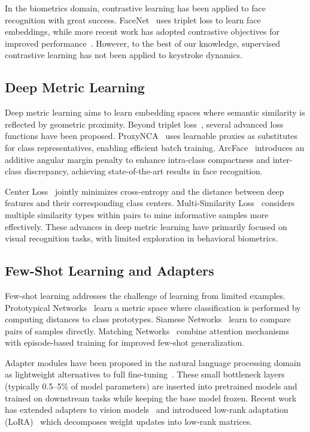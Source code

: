 \documentclass{ieeeaccess}
\begin{document}
{In the biometrics domain, contrastive learning has been applied to face recognition with great success. FaceNet~\cite{b16} uses triplet loss to learn face embeddings, while more recent work has adopted contrastive objectives for improved performance~\cite{b17}. However, to the best of our knowledge, supervised contrastive learning has not been applied to keystroke dynamics.

\subsection{Deep Metric Learning}
Deep metric learning aims to learn embedding spaces where semantic similarity is reflected by geometric proximity. Beyond triplet loss~\cite{b16}, several advanced loss functions have been proposed. ProxyNCA~\cite{b23} uses learnable proxies as substitutes for class representatives, enabling efficient batch training. ArcFace~\cite{b24} introduces an additive angular margin penalty to enhance intra-class compactness and inter-class discrepancy, achieving state-of-the-art results in face recognition.

Center Loss~\cite{b25} jointly minimizes cross-entropy and the distance between deep features and their corresponding class centers. Multi-Similarity Loss~\cite{b26} considers multiple similarity types within pairs to mine informative samples more effectively. These advances in deep metric learning have primarily focused on visual recognition tasks, with limited exploration in behavioral biometrics.

\subsection{Few-Shot Learning and Adapters}
Few-shot learning addresses the challenge of learning from limited examples. Prototypical Networks~\cite{b18} learn a metric space where classification is performed by computing distances to class prototypes. Siamese Networks~\cite{b19} learn to compare pairs of samples directly. Matching Networks~\cite{b27} combine attention mechanisms with episode-based training for improved few-shot generalization.

Adapter modules have been proposed in the natural language processing domain as lightweight alternatives to full fine-tuning~\cite{b20}. These small bottleneck layers (typically 0.5--5\% of model parameters) are inserted into pretrained models and trained on downstream tasks while keeping the base model frozen. Recent work has extended adapters to vision models~\cite{b28} and introduced low-rank adaptation (LoRA)~\cite{b29} which decomposes weight updates into low-rank matrices.

}
\end{document}
